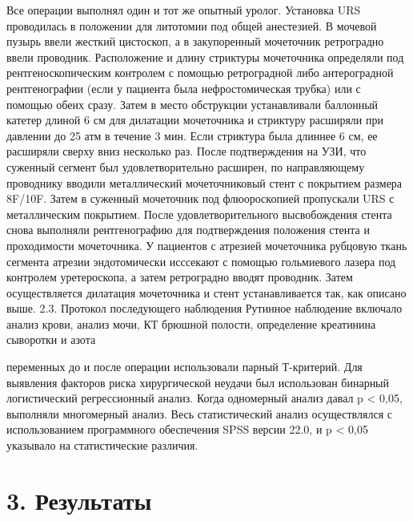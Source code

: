 Все операции выполнял один и тот же опытный уролог. Установка URS проводилась в положении для литотомии под общей анестезией. В мочевой пузырь ввели жесткий цистоскоп, а в закупоренный мочеточник ретроградно ввели проводник. Расположение и длину стриктуры мочеточника определяли под рентгеноскопическим контролем с помощью ретроградной либо антероградной рентгенографии (если у пациента была нефростомическая трубка) или с помощью обеих сразу. Затем в место обструкции устанавливали баллонный катетер длиной 6 см для дилатации мочеточника и стриктуру расширяли при давлении до 25 атм в течение 3 мин.
Если стриктура была длиннее 6 см, ее расширяли сверху вниз несколько раз. После подтверждения на УЗИ, что суженный сегмент был удовлетворительно расширен, по направляющему проводнику вводили металлический мочеточниковый стент с покрытием размера 8F/10F. Затем в суженный мочеточник под флюороскопией пропускали URS с металлическим покрытием. После удовлетворительного высвобождения стента снова выполняли рентгенографию для подтверждения положения стента и проходимости мочеточника. У пациентов с атрезией мочеточника рубцовую ткань сегмента атрезии эндотомически исссекают с помощью гольмиевого лазера под контролем уретероскопа, а затем ретроградно вводят проводник. Затем осуществляется дилатация мочеточника и стент устанавливается так, как описано выше.
2.3. Протокол последующего наблюдения
Рутинное наблюдение включало анализ крови, анализ мочи, КТ брюшной полости, определение креатинина сыворотки и азота

переменных до и после операции использовали парный Т-критерий. Для выявления факторов риска хирургической неудачи был использован бинарный логистический регрессионный анализ. Когда одномерный анализ давал p < 0,05, выполняли многомерный анализ. Весь статистический анализ осуществлялся с использованием программного обеспечения SPSS версии 22.0, и p < 0,05 указывало на статистические различия.

\section{3. Результаты}

